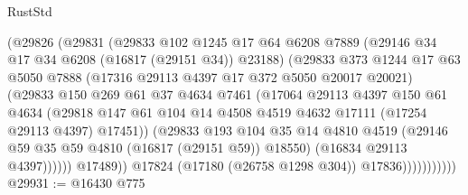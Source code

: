 \begin{lexlean}{RustStd}
\begin{coremodule}
{\begin{coremodule}
{{{{{{{{{{{{{{{{{{{{{{{{{{{{{{{{{{{{{{{{{{{{{{{{{{{{{{{                            (@29826
                              (@29831
                                (@29833
                                  @102
                                  @1245
                                  @17
                                  @64
                                  @6208
                                  @7889
                                  (@29146 @34 @17 @34 @6208 (@16817 (@29151 @34)) @23188)
                                  (@29833
                                    @373
                                    @1244
                                    @17
                                    @63
                                    @5050
                                    @7888
                                    (@17316 @29113 @4397 @17 @372 @5050 @20017 @20021)
                                    (@29833
                                      @150
                                      @269
                                      @61
                                      @37
                                      @4634
                                      @7461
                                      (@17064
                                        @29113
                                        @4397
                                        @150
                                        @61
                                        @4634
                                        (@29818
                                          @147
                                          @61
                                          @104
                                          @14
                                          @4508
                                          @4519
                                          @4632
                                          @17111
                                          (@17254 @29113 @4397)
                                          @17451))
                                      (@29833
                                        @193
                                        @104
                                        @35
                                        @14
                                        @4810
                                        @4519
                                        (@29146 @59 @35 @59 @4810 (@16817 (@29151 @59)) @18550)
                                        (@16834 @29113 @4397))))))
                              @17489))
                          @17824
                          (@17180 (@26758 @1298 @304))
                          @17836)))))))))))
@29931 := @16430 @775
}}}}}}}}}}}}}}}}}}}}}}}}}}}}}}}}}}}}}}}}}}}}}}}}}}}}}}}
\end{coremodule}}
\end{coremodule}
\end{lexlean}
